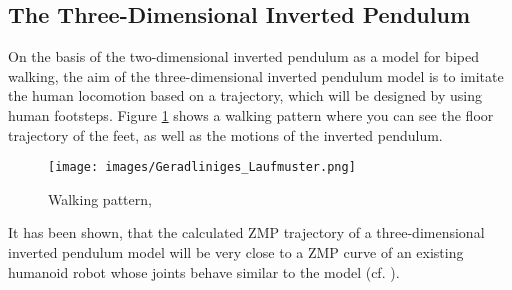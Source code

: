 \documentclass[paper=a4, pagesize, DIV=calc, BCOR=12.5mm, twoside=on, onecolumn=on, open = any, titlepage =on, parskip =half-, headsepline = on, footsepline = on, chapterprefix = on, appendixprefix = off, fontsize = 12pt, numbers = noenddot, abstract = on]{scrbook}
\numberwithin{equation}{chapter}
\theoremstyle{definition}
\theoremstyle{plain}
\theoremstyle{plain}
\theoremstyle{remark}
\theoremstyle{plain}
\theoremstyle{plain}
\begin{document}
\subsection*{The Three-Dimensional Inverted Pendulum}
On the basis of the two-dimensional inverted pendulum as a model for biped walking, the aim of the three-dimensional inverted pendulum model is to imitate the human locomotion based on a trajectory, which will be designed by using human footsteps. Figure \ref{fig: walking pattern} shows a walking pattern where you can see the floor trajectory of the feet, as well as the motions of the inverted pendulum.

\begin{figure}[htbp]
	\centering
	\begin{minipage}[c]{14cm}
		\centering
		\texttt{[image: images/Geradliniges\_Laufmuster.png]} 
		\caption{Walking pattern, \cite[p.106]{kajita:2007}}
		\label{fig: walking pattern}
	\end{minipage}
\end{figure}
It has been shown, that the calculated ZMP trajectory of a three-dimensional inverted pendulum model will be very close to a ZMP curve of an existing humanoid robot whose joints behave similar to the model (cf. \cite[p.115]{kajita:2007}).
\end{document}
